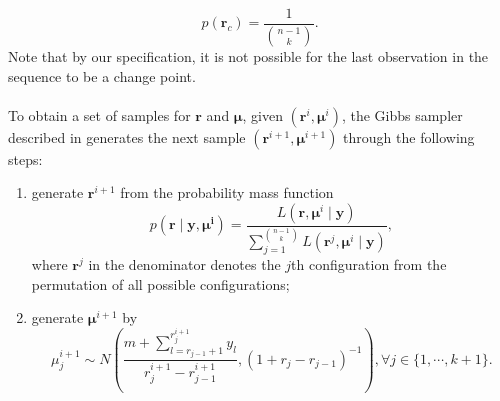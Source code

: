 \[
p(\bm{r}_c) = \frac{1}{\binom{n-1}{k}}.
\]
Note that by our specification, it is not possible for the last observation in the sequence to be a change point.\\\\
To obtain a set of samples for $\bm{r}$ and $\bm{\mu}$, given $\left(\bm{r}^i, \bm{\mu}^i\right)$, the Gibbs sampler described in \cite{carlin1992hierarchical} generates the next sample $\left(\bm{r}^{i+1}, \bm{\mu}^{i+1}\right)$ through the following steps:
\begin{enumerate}
\item generate $\bm{r}^{i+1}$ from the probability mass function
\[
p\left(\bm{r} \mid \bm{y}, \bm{\mu^i}\right) = \frac{L\left( \bm{r}, \bm{\mu}^i \mid \bm{y} \right)}{\sum_{j=1}^{\binom{n-1}{k}} L\left( \bm{r}^j, \bm{\mu}^i \mid \bm{y} \right)},
\]
where $\bm{r}^j$ in the denominator denotes the $j$th configuration from the permutation of all possible configurations;
\item generate $\bm{\mu}^{i+1}$ by
\[
\mu_j^{i+1} \sim N\left( \frac{m+\sum_{l=r_{j-1}+1}^{r_j^{i+1}}y_l}{r_j^{i+1} - r_{j-1}^{i+1}}, \left( 1 + r_j - r_{j-1} \right)^{-1} \right), \forall j \in \{ 1,\cdots, k+1 \}.
\]
\end{enumerate}

